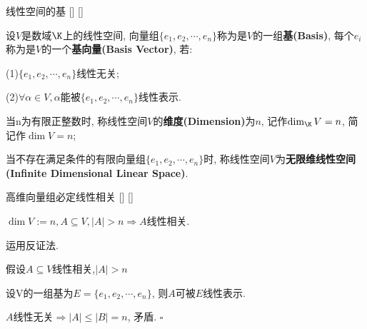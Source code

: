 \documentclass[UTF8]{ctexart}
\begin{document}
		\begin{dfn}
			[]
			{线性空间的基}
			[]
			[]

			设$V$是数域$\K$上的线性空间, 向量组$\{e_{1},e_{2},\cdots,e_{n}\}$称为是$V$的一组\textbf{基(Basis)}, 每个$e_{i}$称为是$V$的一个\textbf{基向量(Basis Vector)}, 若:
			 
			(1)$\{e_{1},e_{2},\cdots,e_{n}\}$线性无关; 
			
			(2)$\forall \alpha\in V,\alpha$能被$\{e_{1},e_{2},\cdots,e_{n}\}$线性表示. 
			
			当n为有限正整数时, 称线性空间$V$的\textbf{维度(Dimension)}为$n$, 记作$\dim_{\K}V=n$, 简记作$\dim V=n$; 
			
			当不存在满足条件的有限向量组$\{e_{1},e_{2},\cdots,e_{n}\}$时, 称线性空间$V$为\textbf{无限维线性空间(Infinite Dimensional Linear Space)}. 

		\end{dfn}
		
		\begin{ppt}
			[]
			{高维向量组必定线性相关}
			[]
			[]

			$\dim V:=n, A\subseteq V, |A|>n\Longrightarrow A$线性相关. 
		\end{ppt}
  
		\begin{prf}
			
			运用反证法. 
			
			假设$A\subseteq V$线性相关,$|A|>n$ 
			
			设V的一组基为$E=\{e_{1},e_{2},\cdots,e_{n}\}$, 则$A$可被$E$线性表示. 
			
			$A$线性无关$\Longrightarrow |A|\leq |B|=n$, 矛盾. $\square$
		\end{prf}
  
\end{document}
